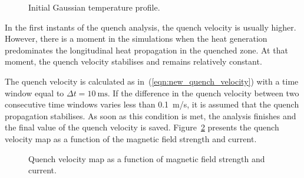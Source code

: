 \begin{figure}[H]
\centering
    \caption{Initial Gaussian temperature profile.}
    \label{fig: init_gauss_temp_distr_quench_velocity}
\end{figure}

In the first instants of the quench analysis, the quench velocity is usually higher. However, there is a moment in the simulations when the heat generation predominates the longitudinal heat propagation in the quenched zone. At that moment, the quench velocity stabilises and remains relatively constant. 

The quench velocity is calculated as in~(\ref{eqn:new_quench_velocity}) with a time window equal to $\Delta t=10~\text{ms}$. If the difference in the quench velocity between two consecutive time windows varies less than 0.1~m/s, it is assumed that the quench propagation stabilises. As soon as this condition is met, the analysis finishes and the final value of the quench velocity is saved. Figure~\ref{fig: v_quench_map_current_b_field} presents the quench velocity map as a function of the magnetic field strength and current.

\begin{figure}[H]
\centering
    \caption{Quench velocity map as a function of magnetic field strength and current.}
    \label{fig: v_quench_map_current_b_field}
\end{figure}